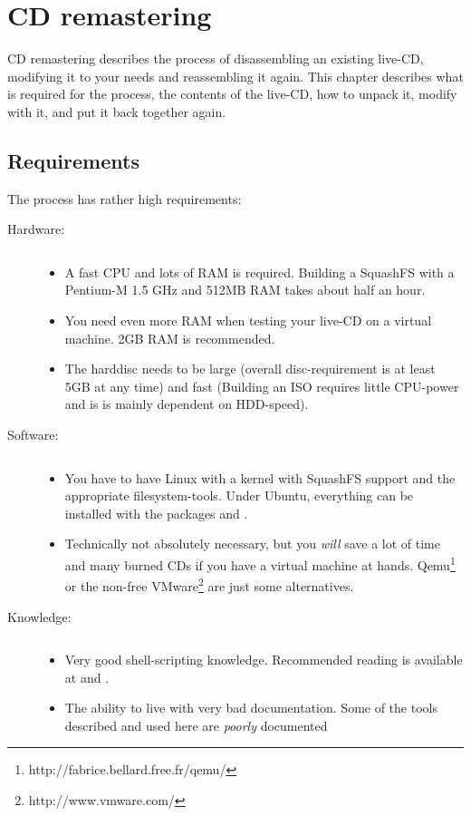 
\chapter{CD remastering}\label{chapter:CD remastering}
CD remastering describes the process of disassembling an existing live-CD,
modifying it to your needs and reassembling it again. This chapter describes
what is required for the process, the contents of the live-CD, how to unpack it,
modify with it, and put it back together again.

\section{Requirements}
The process has rather high requirements:
\begin{description}
 \item[Hardware:] $\qquad$
   \begin{itemize}
    \item A fast CPU and lots of RAM is required. Building a SquashFS with a
      Pentium-M 1.5 GHz and 512MB RAM takes about half an hour.
    \item You need even more RAM when testing your live-CD on a virtual
      machine. 2GB RAM is recommended.
    \item The harddisc needs to be large (overall disc-requirement is at least
      5GB at any time) and fast (Building an ISO requires little CPU-power and
      is is mainly dependent on HDD-speed).
   \end{itemize}
 \item[Software:] $\qquad$
   \begin{itemize}
     \item You have to have Linux with a kernel with SquashFS support and the
       appropriate filesystem-tools. Under Ubuntu, everything can be installed
       with the packages  and .
     \item Technically not absolutely necessary, but you \emph{will} save a lot
       of time and many burned CDs if you have a virtual machine at hands.
       Qemu\footnote{http://fabrice.bellard.free.fr/qemu/} or the non-free
       VMware\footnote{http://www.vmware.com/} are just some alternatives.
   \end{itemize}
 \item[Knowledge:] $\qquad$
   \begin{itemize}
     \item Very good shell-scripting knowledge. Recommended reading is available at
     	\cite{bash-intro} and \cite{bash-advanced}.
     \item The ability to live with very bad documentation. Some of the tools
       described and used here are \emph{poorly} documented
   \end{itemize}
\end{description}

